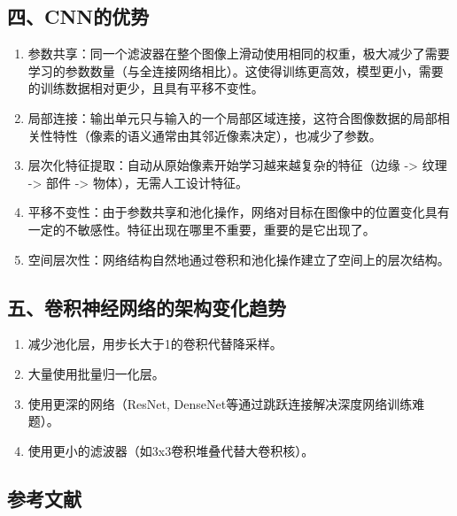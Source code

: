\hypertarget{ux56dbcnnux7684ux4f18ux52bf}{%
\subsection{四、CNN的优势}\label{ux56dbcnnux7684ux4f18ux52bf}}

\begin{enumerate}
\def\labelenumi{\arabic{enumi}.}
\item
  参数共享：同一个滤波器在整个图像上滑动使用相同的权重，极大减少了需要学习的参数数量（与全连接网络相比）。这使得训练更高效，模型更小，需要的训练数据相对更少，且具有平移不变性。
\item
  局部连接：输出单元只与输入的一个局部区域连接，这符合图像数据的局部相关性特性（像素的语义通常由其邻近像素决定），也减少了参数。
\item
  层次化特征提取：自动从原始像素开始学习越来越复杂的特征（边缘 -\textgreater{} 纹理 -\textgreater{} 部件 -\textgreater{} 物体），无需人工设计特征。
\item
  平移不变性：由于参数共享和池化操作，网络对目标在图像中的位置变化具有一定的不敏感性。特征出现在哪里不重要，重要的是它出现了。
\item
  空间层次性：网络结构自然地通过卷积和池化操作建立了空间上的层次结构。
\end{enumerate}

\hypertarget{ux4e94ux5377ux79efux795eux7ecfux7f51ux7edcux7684ux67b6ux6784ux53d8ux5316ux8d8bux52bf}{%
\subsection{五、卷积神经网络的架构变化趋势}\label{ux4e94ux5377ux79efux795eux7ecfux7f51ux7edcux7684ux67b6ux6784ux53d8ux5316ux8d8bux52bf}}

\begin{enumerate}
\def\labelenumi{\arabic{enumi}.}
\item
  减少池化层，用步长大于1的卷积代替降采样。
\item
  大量使用批量归一化层。
\item
  使用更深的网络（ResNet, DenseNet等通过跳跃连接解决深度网络训练难题）。
\item
  使用更小的滤波器（如3x3卷积堆叠代替大卷积核）。
\end{enumerate}

\hypertarget{ux53c2ux8003ux6587ux732e-11}{%
\subsection{参考文献}\label{ux53c2ux8003ux6587ux732e-11}}

